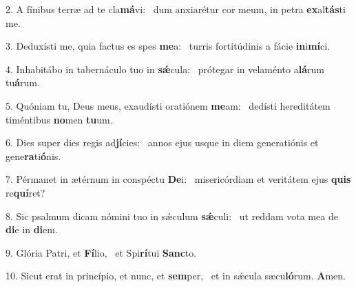 2. A fínibus terræ ad te cla\textbf{má}vi: \ast\  dum anxiarétur cor meum, in petra \textbf{ex}al\textbf{tás}ti me.\

3. Deduxísti me, quia factus es spes \textbf{me}a: \ast\  turris fortitúdinis a fácie \textbf{in}i\textbf{mí}ci.\

4. Inhabitábo in tabernáculo tuo in \textbf{sǽ}cula: \ast\  prótegar in velaménto a\textbf{lá}rum tu\textbf{á}rum.\

5. Quóniam tu, Deus meus, exaudísti oratiónem \textbf{me}am: \ast\  dedísti hereditátem timéntibus \textbf{no}men \textbf{tu}um.\

6. Dies super dies regis ad\textbf{jí}cies: \ast\  annos ejus usque in diem generatiónis et gene\textbf{ra}ti\textbf{ó}nis.\

7. Pérmanet in ætérnum in conspéctu \textbf{De}i: \ast\  misericórdiam et veritátem ejus \textbf{quis} re\textbf{quí}ret?\

8. Sic psalmum dicam nómini tuo in sǽculum \textbf{sǽ}culi: \ast\  ut reddam vota mea de \textbf{di}e in \textbf{di}em.\

9. Glória Patri, et \textbf{Fí}lio, \ast\  et Spi\textbf{rí}tui \textbf{Sanc}to.\

10. Sicut erat in princípio, et nunc, et \textbf{sem}per, \ast\  et in sǽcula sæcu\textbf{ló}rum. \textbf{A}men.\

